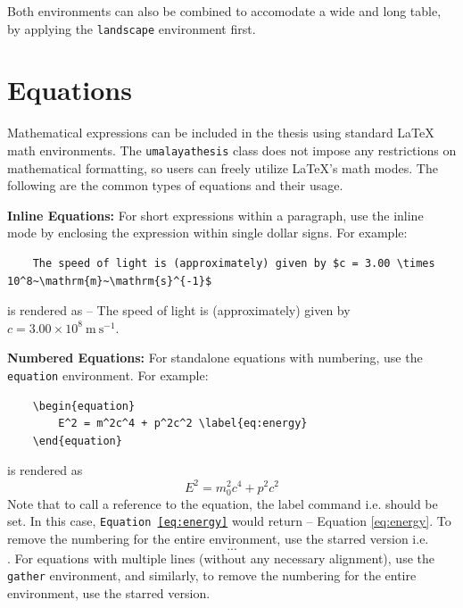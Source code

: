 \documentclass{umalayathesis}
\begin{document}
Both environments can also be combined to accomodate a wide and long table, by applying the \texttt{landscape} environment first.

\section{Equations}

Mathematical expressions can be included in the thesis using standard \LaTeX{} math environments. The \texttt{umalayathesis} class does not impose any restrictions on mathematical formatting, so users can freely utilize \LaTeX{'s} math modes. The following are the common types of equations and their usage.

\textbf{Inline Equations:} For short expressions within a paragraph, use the inline mode by enclosing the expression within single dollar signs. For example: 
\begin{verbatim}
    The speed of light is (approximately) given by $c = 3.00 \times 10^8~\mathrm{m}~\mathrm{s}^{-1}$
\end{verbatim}
is rendered as -- The speed of light is (approximately) given by $c = 3.00 \times 10^8~\mathrm{m}~\mathrm{s}^{-1}$.

\textbf{Numbered Equations:} For standalone equations with numbering, use the \texttt{equation} environment. For example:
\begin{verbatim}
    \begin{equation}
        E^2 = m^2c^4 + p^2c^2 \label{eq:energy}
    \end{equation}
\end{verbatim}
is rendered as 
\begin{equation}
    E^2 = m_0^2c^4 + p^2c^2 \label{eq:energy}
\end{equation}
Note that to call a reference to the equation, the label command i.e. \texttt{\label{...}} should be set. In this case, \texttt{Equation \ref{eq:energy}} would return -- Equation \ref{eq:energy}. To remove the numbering for the entire environment, use the starred version i.e. \texttt{\begin{equation*}...\end{equation*}}. For equations with multiple lines (without any necessary alignment), use the \texttt{gather} environment, and similarly, to remove the numbering for the entire environment, use the starred version. 
\end{document}

